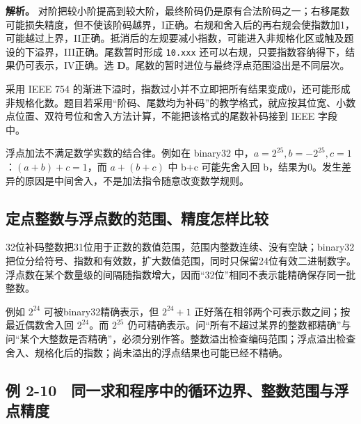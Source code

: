 \textbf{解析。} 对阶把较小阶提高到较大阶，最终阶码仍是原有合法阶码之一；右移尾数可能损失精度，但不使该阶码越界，I正确。右规和舍入后的再右规会使指数加1，可能越过上界，II正确。抵消后的左规要减小指数，可能进入非规格化区或触及题设的下溢界，III正确。尾数暂时形成 \texttt{10.\allowbreak{}xxx} 还可以右规，只要指数容纳得下，结果仍可表示，IV正确。选 \textbf{D}。尾数的暂时进位与最终浮点范围溢出是不同层次。

采用 IEEE 754 的渐进下溢时，指数过小并不立即把所有结果变成0，还可能形成非规格化数。题目若采用``阶码、尾数均为补码''的教学格式，就应按其位宽、小数点位置、双符号位和舍入方法计算，不能把该格式的尾数补码接到 IEEE 字段中。

浮点加法不满足数学实数的结合律。例如在 binary32 中，\(a=2^{25},b=-2^{25},c=1\)：\((a+b)+c=1\)，而 \(a+(b+c)\) 中 b+c 可能先舍入回 b，结果为0。发生差异的原因是中间舍入，不是加法指令随意改变数学规则。

\subsection{定点整数与浮点数的范围、精度怎样比较}\label{CO02-23}

32位补码整数把31位用于正数的数值范围，范围内整数连续、没有空缺；binary32把位分给符号、指数和有效数，扩大数值范围，同时只保留24位有效二进制数字。浮点数在某个数量级的间隔随指数增大，因而``32位''相同不表示能精确保存同一批整数。

例如 \(2^{24}\) 可被binary32精确表示，但 \(2^{24}+1\) 正好落在相邻两个可表示数之间；按最近偶数舍入回 \(2^{24}\)。而 \(2^{25}\) 仍可精确表示。问``所有不超过某界的整数都精确''与问``某个大整数是否精确''，必须分别作答。整数溢出检查编码范围；浮点溢出检查舍入、规格化后的指数；尚未溢出的浮点结果也可能已经不精确。

\subsection{例 2-10　同一求和程序中的循环边界、整数范围与浮点精度}\label{CO02-24}

